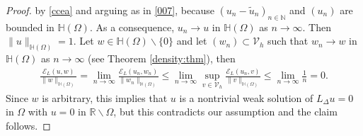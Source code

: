 \documentclass[10 pt]{article}
\numberwithin{equation}{section}
\def\N{\mathbb{N}}
\def\R{\mathbb{R}}
\def\cE{\mathcal{E}}
\begin{document}
\begin{proof}
by \eqref{ccea} and arguing as in \eqref{007}, because $(u_n-\widetilde u_n)_{n\in\N}$ and $(u_n)$ are bounded in $\mathbb H(\Omega)$.  As a consequence, $u_n\to u$ in $\mathbb H(\Omega)$ as $n\to\infty$. Then $\|u\|_{\mathbb H(\Omega)}=1$. Let $w\in \mathbb H(\Omega)\backslash \{0\}$ and let $(w_n)\subset \mathcal V_h$ such that $w_n\to w$ in $\mathbb H(\Omega)$ as $n\to \infty$ (see Theorem \ref{density:thm}), then
\begin{align*}
    \frac{\cE_{L}(u,w)}{\|w\|_{\mathbb H(\Omega)}}=\lim_{n\to\infty}\frac{\cE_{L}(u_n,w_n)}{\|w_n\|_{\mathbb H(\Omega)}}\leq \lim_{n\to\infty}\sup_{v\in \mathcal V_h}\frac{\cE_{L}(u_n,v)}{\|v\|_{\mathbb H(\Omega)}}\leq \lim_{n\to\infty}\frac{1}{n}=0.
\end{align*}
Since $w$ is arbitrary, this implies that $u$ is a nontrivial weak solution of $L_\Delta u=0$ in $\Omega$ with $u=0$ in $\R\backslash  \Omega$, but this contradicts our assumption and the claim follows. 
\end{proof}


\end{document}
